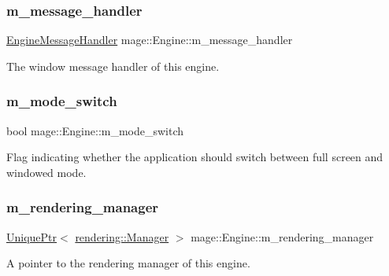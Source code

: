 \subsubsection{\texorpdfstring{m\+\_\+message\+\_\+handler}{m\_message\_handler}}
{\footnotesize\ttfamily \mbox{\hyperlink{classmage_1_1_engine_message_handler}{Engine\+Message\+Handler}} mage\+::\+Engine\+::m\+\_\+message\+\_\+handler\hspace{0.3cm}{\ttfamily [private]}}

The window message handler of this engine. \mbox{\label{classmage_1_1_engine_aa5cb2e0b7bb2c4a9020e79ab832ee221}} 
\subsubsection{\texorpdfstring{m\+\_\+mode\+\_\+switch}{m\_mode\_switch}}
{\footnotesize\ttfamily bool mage\+::\+Engine\+::m\+\_\+mode\+\_\+switch\hspace{0.3cm}{\ttfamily [private]}}

Flag indicating whether the application should switch between full screen and windowed mode. \mbox{\label{classmage_1_1_engine_ae870ec5b532a21112500f0f0f03e9b55}} 
\subsubsection{\texorpdfstring{m\+\_\+rendering\+\_\+manager}{m\_rendering\_manager}}
{\footnotesize\ttfamily \mbox{\hyperlink{namespacemage_a3316d7143a973e37adf1110f2e80ca31}{Unique\+Ptr}}$<$ \mbox{\hyperlink{classmage_1_1rendering_1_1_manager}{rendering\+::\+Manager}} $>$ mage\+::\+Engine\+::m\+\_\+rendering\+\_\+manager\hspace{0.3cm}{\ttfamily [private]}}

A pointer to the rendering manager of this engine. \mbox{\label{classmage_1_1_engine_a45160eecbdcbebcf269436505342db54}} 
